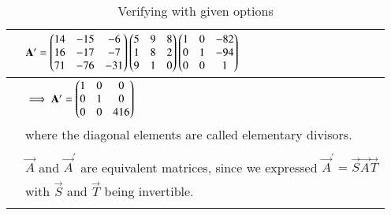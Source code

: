\documentclass[journal,12pt]{IEEEtran}
\begin{document}
\begin{longtable}{|l|l|}
        & $\mathbf{A}' = \begin{pmatrix}14 & -15 & -6\\ 16 & -17 & -7\\71 & -76 & -31\end{pmatrix}\begin{pmatrix}5 & 9 & 8 \\ 1 & 8 & 2\\ 9 & 1 & 0\end{pmatrix}\begin{pmatrix}1 & 0 & -82\\ 0 & 1 & -94\\ 0 & 0 & 1\end{pmatrix}$\\
    \hline
        & $\implies \mathbf{A}' = \begin{pmatrix}1 & 0 & 0\\0 & 1 & 0\\0 & 0 & 416\end{pmatrix}$\\
        & where the diagonal elements are called elementary divisors.\\
        & \\
        & $\vec{A}$ and $\vec{A}^{\prime}$ are equivalent matrices, since we expressed $\vec{A}^{\prime} = \vec{S}\vec{A}\vec{T}$\\
        & with $\vec{S}$ and $\vec{T}$ being invertible.\\ 
    \hline
    \caption{Verifying with given options}
    \label{tab:verify}
\end{longtable}
\end{document}
